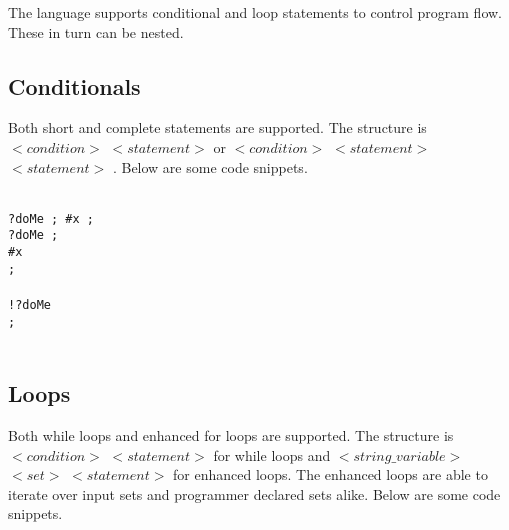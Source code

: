 \documentclass[11pt]{article}
\begin{document}
The language supports conditional and loop statements to control program flow. These in turn can be nested.

\subsection{Conditionals}

Both short and complete \IF statements are supported. The structure is \IF $<condition>$ \THEN $<statement>$ \FI or \IF $<condition>$ \THEN $<statement>$ \ELSE $<statement>$ \FI. Below are some code snippets.

\begin{texto}
	\texttt{\\
		\LET ?doMe \ASS \TRUE; \LET \#x ; \\
		\IF ?doMe \THEN \PRINT {}; \FI \\ \vspace{0.25cm}
	    \IF \#x  \THEN \\
		\tab \PRINT {}; \\
		\ELSE \\
		\tab \IF !?doMe \EQ \FALSE \THEN \\
		\tab \tab \PRINT {}; \\
		\tab \FI \\
		\FI
	 }
\end{texto}

\subsection{Loops}

Both while loops and enhanced for loops are supported. The structure is \FOR $<condition>$ \DO $<statement>$ \DONE for while loops and \FOR $<string\_variable>$ \IN $<set>$ \DO $<statement>$ \DONE for enhanced loops. The enhanced loops are able to iterate over input sets and programmer declared sets alike. Below are some code snippets.
\end{document}
